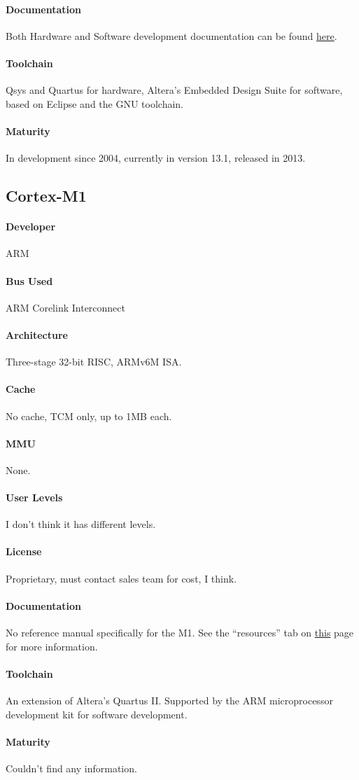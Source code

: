 \documentclass[11pt]{article} %
\begin{document}
\paragraph{Documentation} Both Hardware and Software development documentation can be found \href{https://www.altera.com/support/literature/lit-nio2.html}{here}.
\paragraph{Toolchain} Qsys and Quartus for hardware, Altera's Embedded Design Suite for software, based on Eclipse and the GNU toolchain.
\paragraph{Maturity} In development since 2004, currently in version 13.1, released in 2013.

\subsection{Cortex-M1}
\paragraph{Developer} ARM
\paragraph{Bus Used} ARM Corelink Interconnect
\paragraph{Architecture} Three-stage 32-bit RISC, ARMv6M ISA.
\paragraph{Cache} No cache, TCM only, up to 1MB each.
\paragraph{MMU} None.
\paragraph{User Levels} I don't think it has different levels.
\paragraph{License} Proprietary, must contact sales team for cost, I think.
\paragraph{Documentation} No reference manual specifically for the M1. See the ``resources'' tab on \href{http://www.arm.com/products/processors/cortex-m/cortex-m1.php}{this} page for more information.
\paragraph{Toolchain} An extension of Altera's Quartus II. Supported by the ARM microprocessor development kit for software development.
\paragraph{Maturity} Couldn't find any information.
\end{document}
